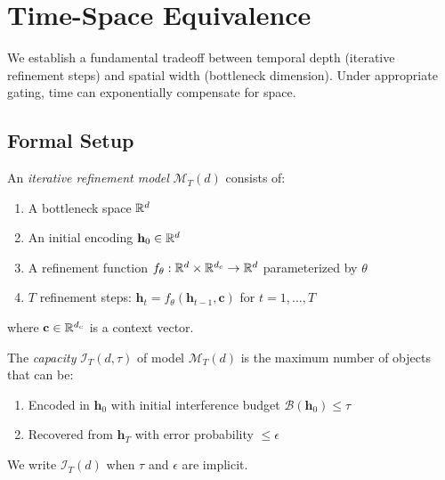 \section{Time-Space Equivalence}
\label{sec:timespace}

We establish a fundamental tradeoff between temporal depth (iterative refinement steps) and spatial width (bottleneck dimension). Under appropriate gating, time can exponentially compensate for space.

\subsection{Formal Setup}

\begin{definition}
\label{def:iterative}
An \emph{iterative refinement model} $\mathcal{M}_T(d)$ consists of:
\begin{enumerate}
    \item[(i)] A bottleneck space $\mathbb{R}^d$
    \item[(ii)] An initial encoding $\mathbf{h}_0 \in \mathbb{R}^d$
    \item[(iii)] A refinement function $f_\theta: \mathbb{R}^d \times \mathbb{R}^{d_c} \to \mathbb{R}^d$ parameterized by $\theta$
    \item[(iv)] $T$ refinement steps: $\mathbf{h}_t = f_\theta(\mathbf{h}_{t-1}, \mathbf{c})$ for $t = 1, \ldots, T$
\end{enumerate}
where $\mathbf{c} \in \mathbb{R}^{d_c}$ is a context vector.
\end{definition}

\begin{definition}
\label{def:capacity_func}
The \emph{capacity} $\mathcal{I}_T(d, \tau)$ of model $\mathcal{M}_T(d)$ is the maximum number of objects that can be:
\begin{enumerate}
    \item[(i)] Encoded in $\mathbf{h}_0$ with initial interference budget $\mathcal{B}(\mathbf{h}_0) \leq \tau$
    \item[(ii)] Recovered from $\mathbf{h}_T$ with error probability $\leq \epsilon$
\end{enumerate}
We write $\mathcal{I}_T(d)$ when $\tau$ and $\epsilon$ are implicit.
\end{definition}

